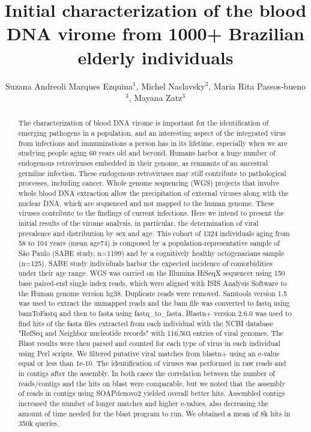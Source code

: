 \documentclass[twoside]{article}
\title{\vspace{-15mm}\fontsize{24pt}{10pt}\selectfont\textbf{Initial characterization of the blood DNA virome from 1000+ Brazilian elderly individuals}} %
\author{Suzana Andreoli Marques Ezquina$^1$, Michel Naslavsky$^2$, Maria Rita Passos-bueno$^3$, Mayana Zatz$^3$}
\affil{1 CENTRO DE ESTUDOS DO GENOMA HUMANO - CEGH -USP\\ 2 CENTRO DE ESTUDOS DO GENOMA HUMANO - CEGH - USP\\ }
\date{}
\begin{document}
\maketitle %

\thispagestyle{fancy} %


\begin{abstract}
The characterization of blood DNA virome is important for the identification of emerging pathogens in a population, and an interesting aspect of the integrated virus from infections and immunizations a person has in its lifetime, especially when we are studying people aging 60 years old and beyond.  Humans harbor a huge number of endogenous retroviruses embedded in their genome, as remnants of an ancestral germline infection. These endogenous retroviruses may still contribute to pathological processes, including cancer. Whole genome sequencing (WGS) projects that involve whole blood DNA extraction allow the precipitation of external viruses along with the nuclear DNA, which are sequenced and not mapped to the human genome. These viruses contribute to the findings of current infections. Here we intend to present the initial results of the virome analysis, in particular, the determination of viral prevalence and distribution by sex and age.
This cohort of 1324 individuals aging from 58 to 104 years (mean age74) is composed by a population-representative sample of S\~ao Paulo (SABE study, n=1199) and by a cognitively healthy octogenarians sample (n=125). SABE study individuals harbor the expected incidence of comorbidities under their age range.
WGS was carried on the Illumina HiSeqX sequencer using 150 base paired-end single index reads, which were aligned with ISIS Analysis Software to the Human genome version hg38. Duplicate reads were removed. Samtools version 1.5 was used to extract the unmapped reads and the bam file was converted to fastq using bamToFastq and then to fasta using fastq\_to\_fasta. 
Blastn+ version 2.6.0 was used to find hits of the fasta files extracted from each individual with the NCBI database "RefSeq and Neighbor nucleotide records" with 116,503 entries of viral genomes. The Blast results were then parsed and counted for each type of virus in each individual using Perl scripts.
We filtered putative viral matches from blastn+ using an e-value equal or less than 1e-10. The identification of viruses was performed in raw reads and in contigs after the assembly. In both cases the correlation between the number of reads/contigs and the hits on blast were comparable, but we noted that the assembly of reads in contigs using SOAPdenovo2 yielded overall better hits. Assembled contigs increased the number of longer matches and higher e-values, also decreasing the amount of time needed for the blast program to run. We obtained a mean of 8k hits in 350k queries.

\end{abstract}
\end{document}

